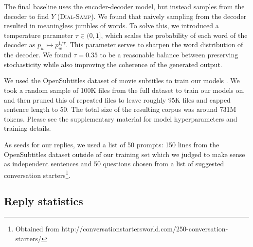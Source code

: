 The final baseline uses the encoder-decoder model, but instead samples from the decoder to find $Y$ (\textsc{Dial-Samp}). We found that naively sampling from the decoder resulted in meaningless jumbles of words. To solve this, we introduced a temperature parameter $\tau \in (0, 1]$, which scales the probability of each word of the decoder as $p_w \mapsto p_w^{1/\tau}$. This parameter serves to sharpen the word distribution of the decoder. We found $\tau = 0.35$ to be a reasonable balance between preserving stochasticity while also improving the coherence of the generated output.

We used the OpenSubtitles dataset of movie subtitles to train our models \citep{Tiedeman:12}. We took a random sample of 100K files from the full dataset to train our models on, and then pruned this of repeated files to leave roughly 95K files and capped sentence length to 50. The total size of the resulting corpus was around 731M tokens. Please see the supplementary material for model hyperparameters and training details.

As seeds for our replies, we used a list of 50 prompts: 150 lines from the OpenSubtitles dataset outside of our training set which we judged to make sense as independent sentences and 50 questions chosen from a list of suggested conversation starters\footnote{Obtained from http://conversationstartersworld.com/250-conversation-starters/}.

\subsection{Reply statistics}

\begin{table}[t]
\caption{Some statistics pertaining to the responses generated by the models.}
\label{tab:statistics}
\end{table}


